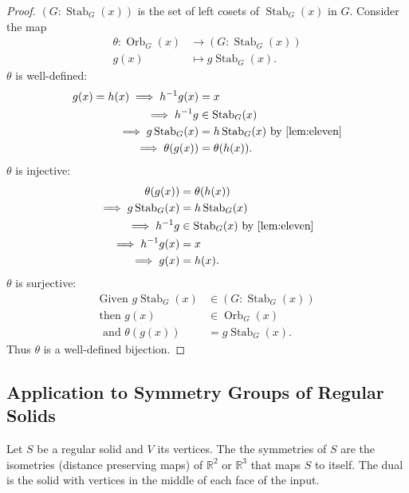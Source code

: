 \begin{proof}
    $(G : \operatorname{Stab}_G(x))$ is the set of left cosets of $\operatorname{Stab}_G(x)$ in $G$.
    Consider the map 
    \begin{align*}
        \theta : \operatorname{Orb}_G(x) &\to (G : \operatorname{Stab}_G(x)) \\
        g(x) &\mapsto g \operatorname{Stab}_G(x).
    \end{align*}  
    $\theta$ is well-defined: 
    \begin{align*}
        g(x) = h(x) \implies h^{-1}g(x) &= x \\
        \implies h^{-1}g &\in \operatorname{Stab}_G(x) \\
        \implies g \operatorname{Stab}_G(x) &= h \operatorname{Stab}_G(x) \text{ by \Cref{lem:eleven}} \\
        \implies \theta(g(x)) &= \theta(h(x)).
    \end{align*} 
    $\theta$ is injective: 
    \begin{align*}
        \theta(g(x)) &= \theta(h(x)) \\
        \implies g \operatorname{Stab}_G(x) &= h \operatorname{Stab}_G(x) \\
        \implies h^{-1}g &\in \operatorname{Stab}_G(x) \text{ by \Cref{lem:eleven}} \\
        \implies h^{-1}g(x) &= x \\
        \implies g(x) &= h(x).
    \end{align*}
    $\theta$ is surjective:
    \begin{align*}
        \text{Given } g \operatorname{Stab}_G(x) &\in (G : \operatorname{Stab}_G(x)) \\
        \text{then } g(x) &\in \operatorname{Orb}_G(x) \\
        \text{ and } \theta(g(x)) &= g \operatorname{Stab}_G(x).
    \end{align*} 
    Thus $\theta$ is a well-defined bijection.
\end{proof} 

\subsection{Application to Symmetry Groups of Regular Solids}
Let $S$ be a regular solid and $V$ its vertices.
The the symmetries of $S$ are the isometries (distance preserving maps) of $\mathbb{R}^2$ or $\mathbb{R}^3$ that maps $S$ to itself.
The dual is the solid with vertices in the middle of each face of the input.

